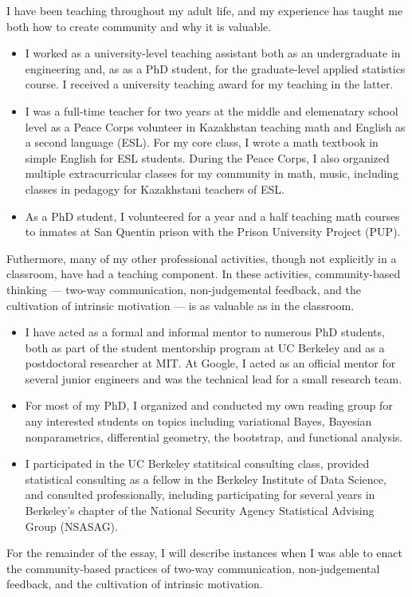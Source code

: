 I have been teaching throughout my adult life, and my experience has taught me
both how to create community and why it is valuable.
%
\begin{itemize}
    \item I worked as a university-level teaching assistant both as an
    undergraduate in engineering and, as  as a PhD student, for the
    graduate-level applied statistics course. I received a university teaching
    award for my teaching in the latter.
%
    \item I was a full-time teacher for two years at the middle and elemenatary
    school level as a Peace Corps volunteer in Kazakhstan teaching math and
    English as a second language (ESL).  For my core class, I wrote a math
    textbook in simple English for ESL students.  During the Peace Corps, I also
    organized multiple extracurricular classes for my community in math, music,
    including classes in pedagogy for Kazakhstani teachers of ESL.
%
    \item As a PhD student, I volunteered for a year and a half teaching math
    courses to inmates at San Quentin prison with the Prison University Project
    (PUP).
%
\end{itemize}

Futhermore, many of my other professional activities, though not explicitly in a
classroom, have had a teaching component.  In these activities, community-based
thinking --- two-way communication, non-judgemental feedback, and the
cultivation of intrinsic motivation --- is as valuable as in the classroom.
%
\begin{itemize}
    \item I have acted as a formal and informal mentor to numerous PhD students,
    both as part of the student mentorship program at UC Berkeley and as a
    postdoctoral researcher at MIT.  At Google, I acted as an official mentor
    for several junior engineers and was the technical lead for a small research
    team.
%
    \item For most of my PhD, I organized and conducted my own reading group for
    any interested students on topics including variational Bayes, Bayesian
    nonparametrics, differential geometry, the bootstrap, and functional
    analysis.
%
    \item I participated in the UC Berkeley statitsical consulting class,
    provided statistical consulting as a fellow in the Berkeley Institute of
    Data Science, and consulted professionally, including participating for
    several years in Berkeley's chapter of the National Security Agency
    Statistical Advising Group (NSASAG).
%
\end{itemize}
%
For the remainder of the essay, I will describe instances when I was able to
enact the community-based practices of two-way communication, non-judgemental
feedback, and the cultivation of intrinsic motivation.


